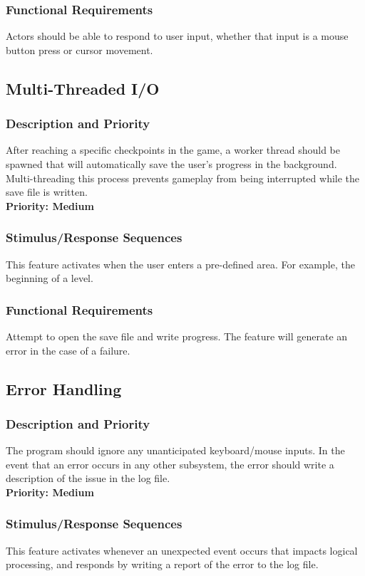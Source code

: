 \documentclass{article}
\begin{document}
		\subsubsection{Functional Requirements}
			Actors should be able to respond to user input, whether that input is a mouse button press or cursor movement. 
	\subsection{Multi-Threaded I/O}
		\subsubsection{Description and Priority}
			After reaching a specific checkpoints in the game, a worker thread should be spawned that will automatically save the user's progress in the background. Multi-threading this process prevents gameplay from being interrupted while the save file is written. \bigskip \\
			\textbf{Priority: Medium}
		\subsubsection{Stimulus/Response Sequences}
			This feature activates when the user enters a pre-defined area. For example, the beginning of a level. 
		\subsubsection{Functional Requirements}
			Attempt to open the save file and write progress. The feature will generate an error in the case of a failure. 
	\subsection{Error Handling}
		\subsubsection{Description and Priority}
			The program should ignore any unanticipated keyboard/mouse inputs. In the event that an error occurs in any other subsystem, the error should write a description of the issue in the log file. \bigskip \\
			\textbf{Priority: Medium}
		\subsubsection{Stimulus/Response Sequences}
			This feature activates whenever an unexpected event occurs that impacts logical processing, and responds by writing a report of the error to the log file. 
\end{document}
